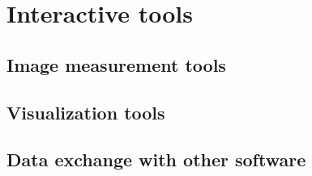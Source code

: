 \documentclass[twocolumn]{bmcart}%
\begin{document}
 
%


\section*{Interactive tools} 
\subsection*{Image measurement tools}
\subsection*{Visualization tools}
\subsection*{Data exchange with other software}

% 
%
%
%
%

\end{document}
